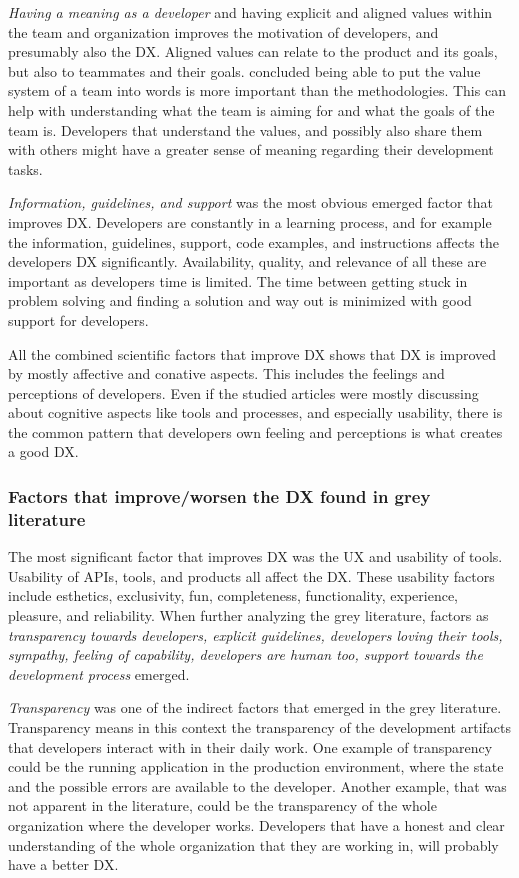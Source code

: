 \documentclass[english, 12pt, a4paper, sci, utf8, a-1b, online]{aaltothesis}
\begin{document}
\textit{Having a meaning as a developer} and having explicit and aligned values within the team and organization improves the motivation of developers, and presumably also the DX. Aligned values can relate to the product and its goals, but also to teammates and their goals. \textcite{fagerholm2014examining} concluded being able to put the value system of a team into words is more important than the methodologies. This can help with understanding what the team is aiming for and what the goals of the team is. Developers that understand the values, and possibly also share them with others might have a greater sense of meaning regarding their development tasks.

\textit{Information, guidelines, and support} was the most obvious emerged factor that improves DX. Developers are constantly in a learning process, and for example the information, guidelines, support, code examples, and instructions affects the developers DX significantly. Availability, quality, and relevance of all these are important as developers time is limited. The time between getting stuck in problem solving and finding a solution and way out is minimized with good support for developers.

All the combined scientific factors that improve DX shows that DX is improved by mostly affective and conative aspects. This includes the feelings and perceptions of developers. Even if the studied articles were mostly discussing about cognitive aspects like tools and processes, and especially usability, there is the common pattern that developers own feeling and perceptions is what creates a good DX.

\subsubsection{Factors that improve/worsen the DX found in grey literature}

The most significant factor that improves DX was the UX and usability of tools. Usability of APIs, tools, and products all affect the DX. These usability factors include esthetics, exclusivity, fun, completeness, functionality, experience, pleasure, and reliability. When further analyzing the grey literature, factors as \textit{transparency towards developers,	explicit guidelines, developers loving their tools, sympathy, feeling of capability, developers are human too, support towards the development process} emerged.

\textit{Transparency} was one of the indirect factors that emerged in the grey literature. Transparency means in this context the transparency of the development artifacts that developers interact with in their daily work. One example of transparency could be the running application in the production environment, where the state and the possible errors are available to the developer. Another example, that was not apparent in the literature, could be the transparency of the whole organization where the developer works. Developers that have a honest and clear understanding of the whole organization that they are working in, will probably have a better DX.
\end{document}
